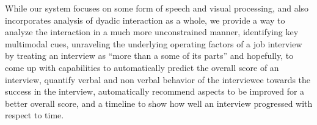 While our system focuses on some form of speech and visual processing, and also incorporates analysis of dyadic interaction as a whole, we provide a way to analyze the interaction in a much more unconstrained manner, identifying key multimodal cues, unraveling the underlying operating factors of a job interview by treating an interview as “more than a some of its parts” and hopefully, to come up with capabilities to automatically predict the overall score of an interview, quantify verbal and non verbal behavior of the interviewee towards the success in the interview, automatically recommend aspects to be improved for a better overall score, and a timeline to show how well an interview progressed with respect to time.